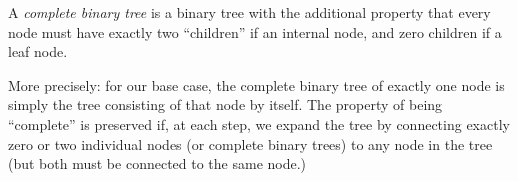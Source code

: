 \documentclass[12pt]{article}
\begin{document}
A \emph{complete binary tree} is a binary tree with the additional property that every node must have exactly two ``children'' if an internal node, and zero children if a leaf node.  

More precisely: for our base case, the complete binary tree of exactly one node is simply the tree consisting of that node by itself.  The property of being ``complete'' is preserved if, at each step, we expand the tree by connecting exactly zero or two individual nodes (or complete binary trees) to any node in the tree (but both must be connected to the same node.)
\end{document}
